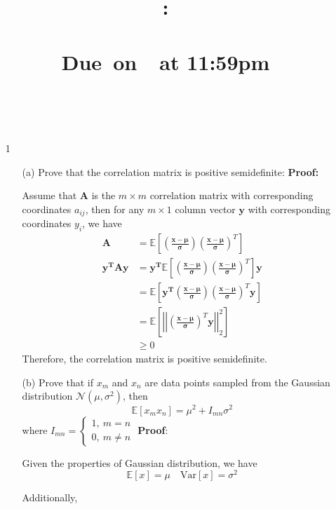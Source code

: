 \documentclass{article}
\title{
    \vspace{2in}
    \textmd{\textbf{\hmwkClass:\\ \hmwkTitle}}\\
    \normalsize\vspace{0.1in}\small{Due\ on\ \hmwkDueDate\ at 11:59pm}\\
    \vspace{0.1in}\large{\textit{\hmwkClassInstructor}}
    \vspace{3in}
}
\author{\textbf{\hmwkAuthorName}\\ \hmwkAuthorID}
\date{}
\newcommand{\E}{\mathbb{E}}
\newcommand{\Var}{\mathrm{Var}}
\renewcommand{\b}[1]{\bm{#1}}
\begin{document}
\maketitle

\pagebreak

\begin{enumerate}
    \item[1]
    \begin{enumerate}
    \setlength\parindent{2em}
        \item[(a)] Prove that the correlation matrix is positive semidefinite:\newline
        {\bf Proof:}\par Assume that $\b{A}$ is the $m\times m$ correlation matrix with corresponding coordinates $a_{ij}$, then for any $m\times 1$ column vector $\b{y}$ with corresponding coordinates $y_{i}$, we have 
        \begin{align*}
            \b{A} &= \E\left[\left(\frac{\b{x}-\b{\mu}}{\b{\sigma}}\right)\left(\frac{\b{x}-\b{\mu}}{\b{\sigma}}\right)^T\right]\\
            \b{y^T}\b{A}\b{y} &= \b{y^T}\E\left[\left(\frac{\b{x}-\b{\mu}}{\b{\sigma}}\right)\left(\frac{\b{x}-\b{\mu}}{\b{\sigma}}\right)^T\right]\b{y}\\
            &= \E\left[\b{y^T}\left(\frac{\b{x}-\b{\mu}}{\b{\sigma}}\right)\left(\frac{\b{x}-\b{\mu}}{\b{\sigma}}\right)^T\b{y}\right]\\
            &= \E\left[\left|\left|\left(\frac{\b{x}-\b{\mu}}{\b{\sigma}}\right)^T\b{y}\right|\right|_2^2\right]\\
            &\geq 0
        \end{align*}
        Therefore, the correlation matrix is positive semidefinite.
        \item[(b)] Prove that if $x_{m}$ and $x_n$ are data points sampled from
         the Gaussian distribution $\mathcal{N}(\mu, \sigma^2)$, then 
         \[\E[x_mx_n]= \mu^2+I_{mn}\sigma^2\] where $I_{mn}=\left\{\begin{aligned}
            1,\ m=n\\
            0,\ m\neq n
         \end{aligned}\right.$\newline
        {\bf Proof}:\par
        Given the properties of Gaussian distribution, we have\[\E[x]=\mu\quad \Var[x]=\sigma^2\]
        \par Additionally, 
        \begin{align*}

\end{align*}
\end{enumerate}
\end{enumerate}
\end{document}
